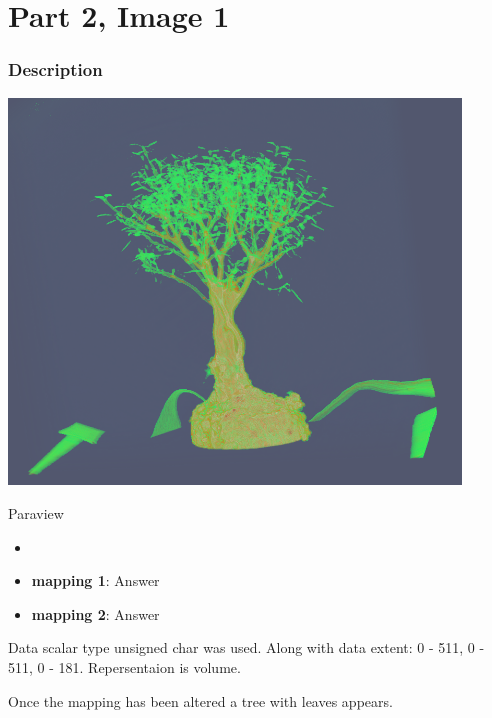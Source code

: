 \hypertarget{part-2-image-1}{%
\section{Part 2, Image 1}\label{part-1-design-2}}

\centering


\hypertarget{description}{%
	\subsubsection{Description}\label{description}}

\begin{description}
	\item[Image:]
	\item\includegraphics[width=12cm]{Tree1.png}

	\item[Tool:] Paraview
	\item[Visual Mappings:]
	\begin{itemize}
		\tightlist
		\item[ ]
	\end{itemize}
	\begin{itemize}
		\tightlist
		\item
		\textbf{mapping 1}: Answer
	\end{itemize}
	
	\begin{itemize}
		\tightlist
		\item
		\textbf{mapping 2}: Answer
	\end{itemize}
	\item[Data Preparation:] Data scalar type unsigned char was used. Along with data extent: 0 - 511, 0 - 511, 0 - 181. Repersentaion is volume.
	\item[Unique Observation:]
	Once the mapping has been altered a tree with leaves appears.
\end{description}